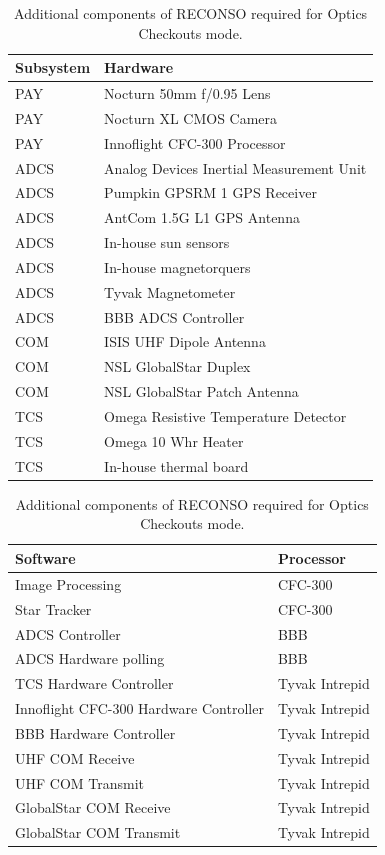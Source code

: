\documentclass{article}
\begin{document}
\begin{table}[h!]
\caption{Additional components of RECONSO required for Optics Checkouts mode.}
\begin{adjustbox}{center}
\begin{tabular}{|l|l|}
\hline
Subsystem & Hardware \\ \hline \hline
PAY & Nocturn 50mm f/0.95 Lens  \\ \hline
PAY & Nocturn XL CMOS Camera  \\ \hline
PAY & Innoflight CFC-300 Processor  \\ \hline \hline
ADCS & Analog Devices Inertial Measurement Unit  \\ \hline
ADCS & Pumpkin GPSRM 1 GPS Receiver \\ \hline
ADCS & AntCom 1.5G L1 GPS Antenna  \\ \hline
ADCS & In-house sun sensors  \\ \hline
ADCS & In-house magnetorquers  \\ \hline
ADCS & Tyvak Magnetometer \\ \hline
ADCS & BBB ADCS Controller \\ \hline \hline
COM & ISIS UHF Dipole Antenna  \\ \hline
COM & NSL GlobalStar Duplex  \\ \hline
COM & NSL GlobalStar Patch Antenna \\ \hline \hline
TCS & Omega Resistive Temperature Detector \\ \hline
TCS & Omega 10 Whr Heater  \\ \hline
TCS & In-house thermal board \\ \hline
\end{tabular}

\quad

\begin{tabular}{|l|l|}
\hline
Software & Processor \\ \hline \hline
Image Processing & CFC-300 \\ \hline
Star Tracker & CFC-300 \\ \hline
ADCS Controller & BBB \\ \hline
ADCS Hardware polling & BBB \\ \hline \hline
TCS Hardware Controller & Tyvak Intrepid \\ \hline
Innoflight CFC-300 Hardware Controller & Tyvak Intrepid \\ \hline
BBB Hardware Controller & Tyvak Intrepid \\ \hline
UHF COM Receive & Tyvak Intrepid \\ \hline
UHF COM Transmit & Tyvak Intrepid \\ \hline
GlobalStar COM Receive & Tyvak Intrepid \\ \hline
GlobalStar COM Transmit & Tyvak Intrepid \\ \hline
\end{tabular}
\end{adjustbox}
\end{table}
\end{document}
